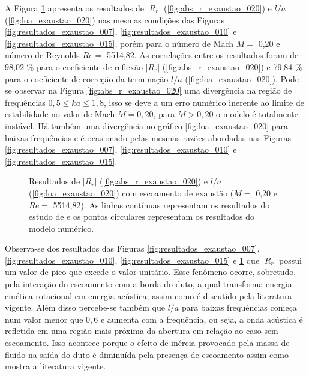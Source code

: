 \newpage
A Figura \ref{fig:resultados_exaustao_020} apresenta os resultados de $|R_{r}|$ (\ref{fig:abs_r_exaustao_020}) e  $l/a$ (\ref{fig:loa_exaustao_020}) nas mesmas condições das Figuras \ref{fig:resultados_exaustao_007}, \ref{fig:resultados_exaustao_010} e \ref{fig:resultados_exaustao_015}, porém para o número de Mach $M =$ 0,20 e número de Reynolds $Re =$ 5514,82. As correlações entre os resultados foram de 98,02 \% para o coeficiente de reflexão $|R_{r}|$ (\ref{fig:abs_r_exaustao_020}) e 79,84 \% para o coeficiente de correção da terminação $l/a$ (\ref{fig:loa_exaustao_020}). Pode-se observar na Figura \ref{fig:abs_r_exaustao_020} uma divergência na região de frequências $0,5 \leq ka \leq 1,8$, isso se deve a um erro numérico inerente ao limite de estabilidade no valor de Mach $M = 0,20$, para $M > 0,20$ o modelo é totalmente instável. Há também uma divergência no gráfico \ref{fig:loa_exaustao_020} para baixas frequências e é ocasionado pelas mesmas razões abordadas nas Figuras \ref{fig:resultados_exaustao_007}, \ref{fig:resultados_exaustao_010} e \ref{fig:resultados_exaustao_015}.


\begin{figure}[ht!]
\begin{subfigure}{\scaleA \textwidth}
  
\end{subfigure}%
\begin{subfigure}{\scaleA \textwidth}
  
\end{subfigure}
\caption[Resultados de $|R_{r}|$ e $l/a$ com escoamento de exaustão (M $=$ 0,2 e Re $=$ 5514,82)]{Resultados de $|R_{r}|$ (\ref{fig:abs_r_exaustao_020}) e $l/a$ (\ref{fig:loa_exaustao_020}) com escoamento de exaustão ($M =$ 0,20 e $Re =$ 5514,82). As linhas contínuas representam os resultados do estudo de  e os pontos circulares representam os resultados do modelo numérico.}
\label{fig:resultados_exaustao_020}
\end{figure}

Observa-se dos resultados das Figuras \ref{fig:resultados_exaustao_007}, \ref{fig:resultados_exaustao_010}, \ref{fig:resultados_exaustao_015} e \ref{fig:resultados_exaustao_020} que $|R_{r}|$ possui um valor de pico que excede o valor unitário. Esse fenômeno ocorre, sobretudo, pela interação do escoamento com a borda do duto, a qual transforma energia cinética rotacional em energia acústica, assim como é discutido pela literatura vigente. Além disso percebe-se também que $l/a$ para baixas frequências começa num valor menor que $0,6$ e aumenta com a frequência, ou seja, a onda acústica é refletida em uma região mais próxima da abertura em relação ao caso sem escoamento. Isso acontece porque o efeito de inércia provocado pela massa de fluido na saída do duto é diminuída pela presença de escoamento assim como mostra a literatura vigente.

